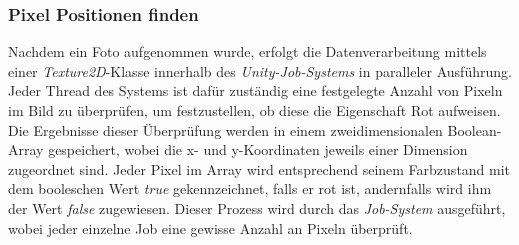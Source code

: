 \subsubsection{Pixel Positionen finden}
Nachdem ein Foto aufgenommen wurde, erfolgt die Datenverarbeitung mittels einer \textit{Texture2D}-Klasse innerhalb des \textit{Unity-Job-Systems} in paralleler Ausführung. Jeder Thread des Systems ist dafür zuständig eine festgelegte Anzahl von Pixeln im Bild zu überprüfen, um festzustellen, ob diese die Eigenschaft Rot aufweisen. Die Ergebnisse dieser Überprüfung werden in einem zweidimensionalen Boolean-Array gespeichert, wobei die x- und y-Koordinaten jeweils einer Dimension zugeordnet sind. Jeder Pixel im Array wird entsprechend seinem Farbzustand mit dem booleschen Wert \textit{true} gekennzeichnet, falls er rot ist, andernfalls wird ihm der Wert \textit{false} zugewiesen. Dieser Prozess wird durch das \textit{Job-System} ausgeführt, wobei jeder einzelne Job eine gewisse Anzahl an Pixeln überprüft.

